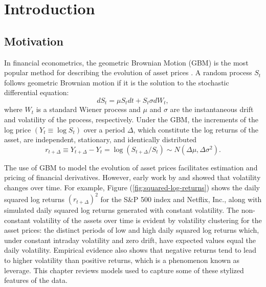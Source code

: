 \chapter{Introduction} \label{chapter:1}

\section{Motivation} \label{section:GBM}
In financial econometrics, the geometric Brownian Motion (GBM) is the most popular method for describing the evolution of asset prices \citep*{hull1987pricing}. A random process $S_t$ follows geometric Brownian motion if it is the solution to the stochastic differential equation:
\begin{equation}
	dS_t = \mu S_t dt + S_t \sigma dW_t,
\end{equation}
where $W_t$ is a standard Wiener process and $\mu$ and $\sigma$ are the instantaneous drift and volatility of the process, respectively. Under the GBM, the increments of the log price $(Y_t \equiv \log S_t)$ over a period $\Delta$, which constitute the log returns of the asset, are independent, stationary, and identically distributed 
	\[ r_{t+\Delta} \equiv Y_{t + \Delta} - Y_t = \log(S_{t+\Delta}/S_t) \sim N\left( \Delta \mu, \Delta \sigma^2\right). \]

The use of GBM to model the evolution of asset prices facilitates estimation and pricing of financial derivatives. However, early work by \cite{mandelbrot1967variation} and \cite{fama1965behavior} showed that volatility changes over time. For example, Figure (\ref{fig:squared-log-returns}) shows the daily squared log returns $(r_{t + \Delta})^2$ for the S\&P 500 index and Netflix, Inc., along with simulated daily squared log returns generated with constant volatility. The non-constant volatility of the assets over time is evident by volatility clustering for the asset prices: the distinct periods of low and high daily squared log returns which, under constant intraday volatility and zero drift, have expected values equal the daily volatility. Empirical evidence also shows that negative returns tend to lead to higher volatility than positive returns, which is a phenomenon known as leverage. This chapter reviews models used to capture some of these stylized features of the data.

